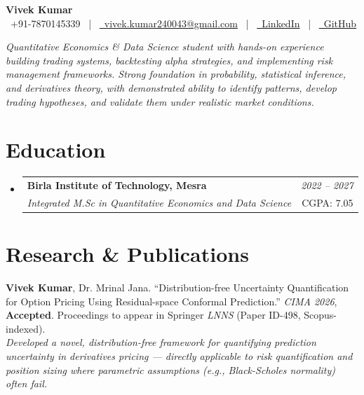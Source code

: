 \documentclass[a4paper,10pt]{article}
\makeatletter
\newcommand{\resumeSubheading}[4]{\vspace{0.5mm}\item
    \begin{tabular*}{0.98\textwidth}[t]{l@{\extracolsep{\fill}}r}
        \textbf{#1} & \textit{\footnotesize{#4}} \\
        \textit{\footnotesize{#3}} &  \footnotesize{#2}
    \end{tabular*}
}
\newcommand{\resumeSubHeadingListStart}{\begin{itemize}[leftmargin=*,labelsep=0mm]}
\newcommand{\resumeSubHeadingListEnd}{\end{itemize}\vspace{1mm}}
\makeatother
\begin{document}
\selectfont

\begin{center}
    {\Huge \textbf{Vivek Kumar}} \\ \vspace{2mm}
    \faPhone\ +91-7870145339 ~|~
    \href{mailto:vivek.kumar240043@gmail.com}{\faEnvelope\ vivek.kumar240043@gmail.com} ~|~
    \href{https://in.linkedin.com/in/vivek-kumar-3556412a0}{\faLinkedin\ LinkedIn} ~|~
    \href{https://github.com/KalWardin-Dronzer}{\faGithub\ GitHub}
\end{center}

\vspace{-2mm}
\begin{center}
\small \textit{Quantitative Economics \& Data Science student with hands-on experience building trading systems, backtesting alpha strategies, and implementing risk management frameworks. Strong foundation in probability, statistical inference, and derivatives theory, with demonstrated ability to identify patterns, develop trading hypotheses, and validate them under realistic market conditions.}
\end{center}

\section{Education}
\resumeSubHeadingListStart
    \resumeSubheading
      {Birla Institute of Technology, Mesra}{CGPA: 7.05}
      {Integrated M.Sc in Quantitative Economics and Data Science}{2022 -- 2027}
\resumeSubHeadingListEnd

\section{Research \& Publications}
\begin{itemize}[leftmargin=3ex, labelsep=1.2mm, itemsep=0mm]
    \small{\item \textbf{Vivek Kumar}, Dr. Mrinal Jana. ``Distribution-free Uncertainty Quantification for Option Pricing Using Residual-space Conformal Prediction.'' \textit{CIMA 2026}, \textbf{Accepted}. Proceedings to appear in Springer \textit{LNNS} (Paper ID-498, Scopus-indexed).
    \\ \vspace{1mm}
    \textit{Developed a novel, distribution-free framework for quantifying prediction uncertainty in derivatives pricing — directly applicable to risk quantification and position sizing where parametric assumptions (e.g., Black-Scholes normality) often fail.}}
\end{itemize}
\end{document}
